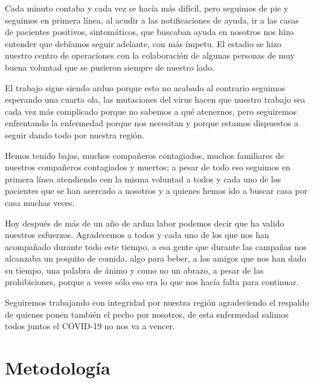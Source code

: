 \documentclass[12pt,a4paper,openany]{book}
\begin{document}
Cada minuto contaba y cada vez se hacía más difícil, pero seguimos de pie y seguimos en primera línea, al acudir a las notificaciones de ayuda, ir a las casas de pacientes positivos, sintomáticos, que buscaban ayuda en nosotros nos hizo entender que debíamos seguir adelante, con más ímpetu. El estadio se hizo nuestro centro de operaciones con la colaboración de algunas personas de muy buena voluntad que se pusieron siempre de nuestro lado.

El trabajo sigue siendo arduo porque esto no acabado al contrario seguimos esperando una cuarta ola, las mutaciones del virus hacen que nuestro trabajo sea cada vez más complicado porque no sabemos a qué atenernos, pero seguiremos enfrentando la enfermedad porque nos necesitan y porque estamos dispuestos a seguir dando todo por nuestra región.

Hemos tenido bajas, muchos compañeros contagiados, muchos familiares de nuestros compañeros contagiados y muertos; a pesar de todo eso seguimos en primera línea atendiendo con la misma voluntad a todos y cada uno de los pacientes que se han acercado a nosotros y a quienes hemos ido a buscar casa por casa muchas veces.

Hoy después de más de un  año de ardua labor podemos decir que ha valido nuestros esfuerzos. Agradecemos a todos y cada uno de los que nos han acompañado durante todo este tiempo, a esa gente que durante las campañas nos alcanzaba un poquito de comida, algo para beber, a los amigos que nos han dado su tiempo, una palabra de ánimo y como no un abrazo, a pesar de las prohibiciones, porque a veces sólo eso era lo que nos hacía falta para continuar.


Seguiremos trabajando con integridad por nuestra región agradeciendo el respaldo de quienes ponen también el pecho por nosotros, de esta enfermedad salimos todos juntos el COVID-19 no nos va a vencer.
	

	
		
	
	\clearpage	
	\section*{Metodología}
	
	
	
\end{document}
